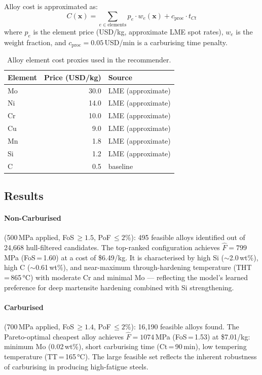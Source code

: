\documentclass[12pt,a4paper]{article}
\begin{document}
Alloy cost is approximated as:
\begin{equation}
  C(\mathbf{x}) = \sum_{e \in \text{elements}} p_e \cdot w_e(\mathbf{x})
               + c_{\text{proc}} \cdot t_{Ct}
\end{equation}
where $p_e$ is the element price (USD/kg, approximate LME spot rates), $w_e$ is the weight
fraction, and $c_{\text{proc}} = 0.05$\,USD/min is a carburising time penalty.

\begin{table}[H]
  \centering
  \caption{Alloy element cost proxies used in the recommender.}
  \label{tab:costs}
  \begin{tabular}{lrl}
    \toprule
    \textbf{Element} & \textbf{Price (USD/kg)} & \textbf{Source} \\
    \midrule
    Mo  & 30.0 & LME (approximate) \\
    Ni  & 14.0 & LME (approximate) \\
    Cr  & 10.0 & LME (approximate) \\
    Cu  &  9.0 & LME (approximate) \\
    Mn  &  1.8 & LME (approximate) \\
    Si  &  1.2 & LME (approximate) \\
    C   &  0.5 & baseline \\
    \bottomrule
  \end{tabular}
\end{table}

\subsection{Results}

\paragraph{Non-Carburised} (500\,MPa applied, FoS\,$\geq 1.5$, PoF\,$\leq 2\%$):
495 feasible alloys identified out of 24,668 hull-filtered candidates. The top-ranked
configuration achieves $\hat{F} = 799$\,MPa (FoS\,=\,1.60) at a cost of \$6.49/kg. It is
characterised by high Si ($\sim$2.0\,wt\%), high C ($\sim$0.61\,wt\%), and near-maximum
through-hardening temperature (THT\,=\,865\,°C) with moderate Cr and minimal Mo — reflecting the
model's learned preference for deep martensite hardening combined with Si strengthening.

\paragraph{Carburised} (700\,MPa applied, FoS\,$\geq 1.4$, PoF\,$\leq 2\%$):
16,190 feasible alloys found. The Pareto-optimal cheapest alloy achieves
$\hat{F} = 1074$\,MPa (FoS\,=\,1.53) at \$7.01/kg: minimum Mo (0.02\,wt\%), short carburising
time (Ct\,=\,90\,min), low tempering temperature (TT\,=\,165\,°C). The large feasible set
reflects the inherent robustness of carburising in producing high-fatigue steels.
\end{document}
